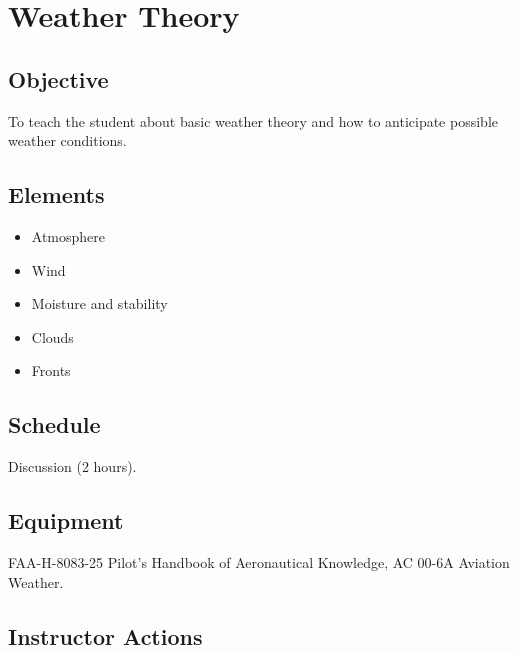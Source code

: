\documentclass[twoside,openright]{report}
\begin{document}
\chapter{Weather Theory}

\section{Objective}

To teach the student about basic weather theory and how to anticipate possible
weather conditions.

\section{Elements}

\begin{itemize}
  \item Atmosphere
  \item Wind
  \item Moisture and stability
  \item Clouds
  \item Fronts
\end{itemize}

\section{Schedule}

Discussion (2 hours).

\section{Equipment}

FAA-H-8083-25 Pilot’s Handbook of Aeronautical Knowledge, AC 00-6A Aviation
Weather.

\section{Instructor Actions}
\end{document}

